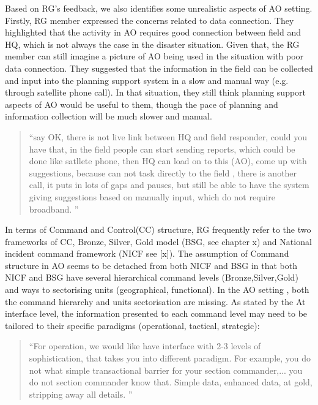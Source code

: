 Based on RG's feedback, we also identifies some unrealistic aspects of AO setting. Firstly, RG member expressed the concerns related to data connection. They highlighted that the activity in AO requires good connection between field and HQ, which is not always the case in the disaster situation. Given that, the RG member can still imagine a picture of AO being used in the situation with poor data connection. They suggested that the information in the field can be collected and input into the planning support system in a slow and manual way (e.g. through satellite phone call). In that situation, they still think planning support aspects of AO would be useful to them, though the pace of planning and information collection will be much slower and manual. \\

\begin{quotation}
``say  OK, there is not live link between HQ and field responder, could you have that, in the field people can start sending reports, which could be done like satllete phone, then HQ can load on to this (AO), come up with suggestions, because can not task directly to the field , there is another call,  it puts in lots of gaps and pauses, but still be able to have the system giving suggestions based on manually input, which do not require broadband. ''
\end{quotation}


In terms of Command and Control(CC) structure, RG frequently refer to the two frameworks of CC,  Bronze, Silver, Gold model (BSG, see chapter x) and National incident command framework (NICF see [x]). The assumption of Command structure in AO seems to be detached from both NICF and BSG in that both NICF and BSG have several hierarchical command levels (Bronze,Silver,Gold) and ways to sectorising units (geographical, functional).  In the AO setting , both the command hierarchy and units sectorisation are missing. As stated by the At interface level, the information presented to each command level may need to be tailored to their specific paradigms (operational, tactical, strategic):

\begin{quotation}
``For operation, we would like have interface with 2-3 levels of sophistication, that takes you into different paradigm. For example, you do not what simple transactional barrier for your section commander,...  you do not section commander know that. Simple data, enhanced data, at gold, stripping away all details. ''
\end{quotation}

